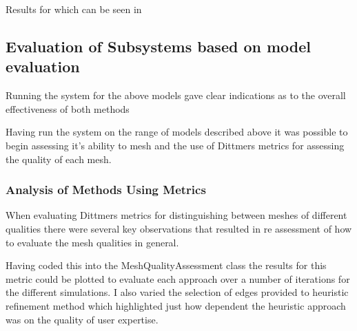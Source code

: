 Results for which can be seen in 


\newpage
\subsection{Evaluation of Subsystems based on model evaluation}
Running the system for the above models gave clear indications as to the overall effectiveness of both methods

Having run the system on the range of models described above it was possible to begin assessing it's ability to mesh and the use of Dittmers metrics for assessing 
the quality of each mesh.

\subsubsection{Analysis of Methods Using Metrics}
When evaluating Dittmers metrics for distinguishing between meshes of different qualities there were several key observations that resulted in re assessment of how to evaluate the mesh qualities in general.

\noindent
Having coded this into the MeshQualityAssessment class the results for this metric could be plotted to evaluate each approach over a number of iterations for the different simulations. I also varied the selection of edges provided to heuristic refinement method which highlighted just how dependent the heuristic approach was on the quality of user expertise.

